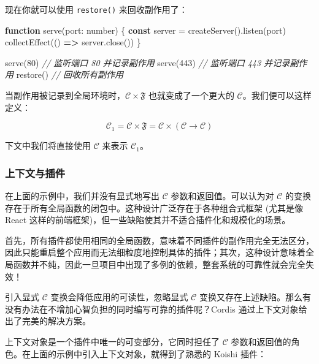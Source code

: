 \documentclass[
  chinese,
  11pt,
]{article}
\newenvironment{Shaded}{}{}
\newcommand{\CommentTok}[1]{\textcolor[rgb]{0.38,0.63,0.69}{\textit{#1}}}
\newcommand{\DataTypeTok}[1]{\textcolor[rgb]{0.56,0.13,0.00}{#1}}
\newcommand{\DecValTok}[1]{\textcolor[rgb]{0.25,0.63,0.44}{#1}}
\newcommand{\FunctionTok}[1]{\textcolor[rgb]{0.02,0.16,0.49}{#1}}
\newcommand{\KeywordTok}[1]{\textcolor[rgb]{0.00,0.44,0.13}{\textbf{#1}}}
\newcommand{\NormalTok}[1]{#1}
\newcommand{\OperatorTok}[1]{\textcolor[rgb]{0.40,0.40,0.40}{#1}}
\begin{document}
现在你就可以使用 \texttt{restore()} 来回收副作用了：

\begin{Shaded}
\begin{Highlighting}[]
\KeywordTok{function} \FunctionTok{serve}\NormalTok{(port}\OperatorTok{:} \DataTypeTok{number}\NormalTok{) \{}
  \KeywordTok{const}\NormalTok{ server }\OperatorTok{=} \FunctionTok{createServer}\NormalTok{()}\OperatorTok{.}\FunctionTok{listen}\NormalTok{(port)}
  \FunctionTok{collectEffect}\NormalTok{(() }\KeywordTok{=\textgreater{}}\NormalTok{ server}\OperatorTok{.}\FunctionTok{close}\NormalTok{())}
\NormalTok{\}}

\FunctionTok{serve}\NormalTok{(}\DecValTok{80}\NormalTok{)               }\CommentTok{// 监听端口 80 并记录副作用}
\FunctionTok{serve}\NormalTok{(}\DecValTok{443}\NormalTok{)              }\CommentTok{// 监听端口 443 并记录副作用}
\FunctionTok{restore}\NormalTok{()               }\CommentTok{// 回收所有副作用}
\end{Highlighting}
\end{Shaded}

当副作用被记录到全局环境时，\(\mathcal{C}\times\mathfrak{F}\)
也就变成了一个更大的 \(\mathcal{C}\)。我们便可以这样定义：

\[
\mathcal{C}_1=\mathcal{C}\times\mathfrak{F}=\mathcal{C}\times\left(\mathcal{C}\to\mathcal{C}\right)
\]

下文中我们将直接使用 \(\mathcal{C}\) 来表示 \(\mathcal{C}_1\)。

\subsubsection{上下文与插件}\label{ux4e0aux4e0bux6587ux4e0eux63d2ux4ef6}

在上面的示例中，我们并没有显式地写出 \(\mathcal{C}\)
参数和返回值。可以认为对 \(\mathcal{C}\)
的变换存在于所有全局函数的闭包中。这种设计广泛存在于各种组合式框架
(尤其是像 React
这样的前端框架)，但一些缺陷使其并不适合插件化和规模化的场景。

首先，所有插件都使用相同的全局函数，意味着不同插件的副作用完全无法区分，因此只能重启整个应用而无法细粒度地控制具体的插件；其次，这种设计意味着全局函数并不纯，因此一旦项目中出现了多例的依赖，整套系统的可靠性就会完全失效！

引入显式 \(\mathcal{C}\) 变换会降低应用的可读性，忽略显式
\(\mathcal{C}\)
变换又存在上述缺陷。那么有没有办法在不增加心智负担的同时编写可靠的插件呢？Cordis
通过上下文对象给出了完美的解决方案。

上下文对象是一个插件中唯一的可变部分，它同时担任了 \(\mathcal{C}\)
参数和返回值的角色。在上面的示例中引入上下文对象，就得到了熟悉的 Koishi
插件：
\end{document}
